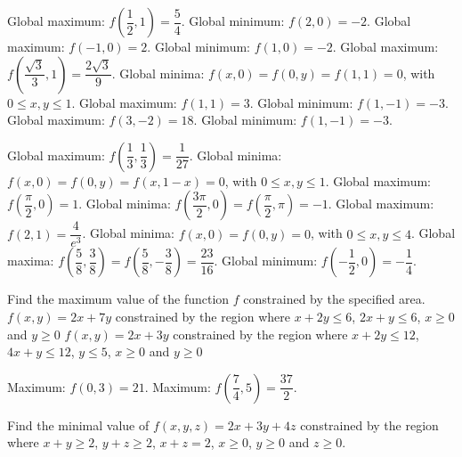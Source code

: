 \begin{Answer}
    
    \Question Global maximum: $f\left( \dfrac{1}{2}, 1 \right) = \dfrac{5}{4}$. Global minimum: $f(2,0)=-2$.
    \Question Global maximum: $f\left( -1 , 0 \right) = 2$. Global minimum: $f(1,0)=-2$.
    \Question Global maximum: $f\left( \dfrac{\sqrt{3}}{3}, 1 \right) = \dfrac{2\sqrt{3}}{9}$. Global minima: $f(x,0)=f(0,y)=f(1,1)=0$, with $0\leq x,y\leq 1$.
    \ifcalculus
    \Question Global maximum: $f\left(1,1\right) = 3$. Global minimum: $f(1,-1)=-3$.
    \Question Global maximum: $f\left(3,-2\right) = 18$. Global minimum: $f(1,-1)=-3$. %
    \fi
    
    \Question Global maximum: $f\left( \dfrac{1}{3}, \dfrac{1}{3} \right) = \dfrac{1}{27}$. Global minima: $f(x,0)=f(0,y)=f(x,1-x)=0$, with $0\leq x,y\leq 1$.
    \Question Global maximum: $f\left( \dfrac{\pi}{2}, 0 \right) = 1$. Global minima: $f\left( \dfrac{3\pi}{2}, 0 \right)=f\left( \dfrac{\pi}{2}, \pi \right)=-1$.
    \Question Global maximum: $f\left( 2, 1 \right) = \dfrac{4}{e^3}$. Global minima: $f\left(x, 0 \right)=f\left(0, y\right)=0$, with $0\leq x,y\leq 4$.
    \ifcalculus 
    \Question Global maxima: $f\left( \dfrac{5}{8},\dfrac{3}{8} \right) = f\left( \dfrac{5}{8},-\dfrac{3}{8} \right) = \dfrac{23}{16}$. Global minimum: $f\left( -\dfrac{1}{2}, 0 \right)=-\dfrac{1}{4}$. 
    \fi
    
\end{Answer}

\begin{Exercise} Find the maximum value of the function $f$ constrained by the specified area.
    \Question[difficulty=1] $f(x,y)=2x+7y$ constrained by the region where  $x+2y\leq 6$, $2x+y\leq 6$, $x\geq 0$ and $y\geq 0$
    \Question[difficulty=1] $f(x,y)=2x+3y$ constrained by the region where $x+2y\leq 12$, $4x+y\leq 12$, $y\leq 5$, $x\geq 0$ and $y\geq 0$
\end{Exercise}

\begin{Answer}
    
    \Question Maximum: $f\left(0,3\right)=21$.
    \Question Maximum: $f\left(\dfrac{7}{4},5\right)=\dfrac{37}{2}$.
    
\end{Answer}

\begin{Exercise}[difficulty = 2] Find the minimal value of $f(x,y,z)=2x+3y+4z$ constrained by the region where $x+y\geq 2$, $y+z\geq 2$, $x+z=2$, $x\geq 0$, $y\geq 0$ and $z\geq 0$.
\end{Exercise}

